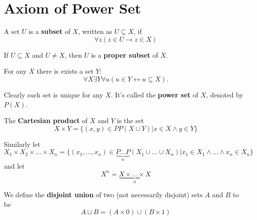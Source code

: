 \documentclass[12pt]{book}
\begin{document}
\section{Axiom of Power Set}
\begin{definition}
	A set $U$ is a {\bf subset} of $X$, written as $U\subseteq X$, if
	\begin{equation}
		\forall z(z\in U\rightarrow z\in X)
	\end{equation}
	
	If $U\subseteq X$ and $U\neq X$, then $U$ is a {\bf proper subset} of $X$.
\end{definition}

\begin{axiom}
	For any $X$ there is exists a set $Y$:
	\begin{equation}
		\forall X\exists Y\forall u (u\in Y\leftrightarrow u\subseteq X).
	\end{equation}
	
	Clearly such set is unique for any $X$. It's called the {\bf power set} of $X$, denoted by $P(X)$.
\end{axiom}
\begin{definition}
	The {\bf Cartesian product} of $X$ and $Y$ is the set
	\begin{equation}
		X\times Y=\{(x,y)\in PP(X\cup Y)|x\in X\wedge y\in Y\}
	\end{equation}
	
	Similarly let
	\begin{equation}
		X_1\times X_2\times\dots\times X_n=\{(x_1,\dots,x_n)\in \underbrace{P\dots P}_{n}(X_1\cup\dots\cup X_n)|x_1\in X_1\wedge\dots\wedge x_n\in X_n\}
	\end{equation}
	and let
	\begin{equation}
		X^n=\underbrace{X\times\dots\times X}_{n}
	\end{equation}
\end{definition}

\begin{definition}
	We define the {\bf disjoint union} of two (not necessarily disjoint) sets $A$ and $B$ to be
	\begin{equation}
		A\sqcup B=(A\times0)\cup(B\times1)
	\end{equation}
\end{definition}
\end{document}
